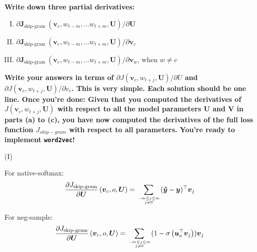 \documentclass[a4 paper]{article}
\newcommand{\bb}[1]{$\boldsymbol{#1}$}
\newcommand{\wtv}{\texttt{word2vec}}
\begin{document}
\textbf{Write down three partial derivatives:}

\begin{enumerate}[(I)]
\item $\partial \boldsymbol{J}_{\text {skip-gram }}\left(\boldsymbol{v}_{c}, w_{t-m}, \ldots w_{t+m}, \boldsymbol{U}\right) / \partial \boldsymbol{U}$
\item $\partial \boldsymbol{J}_{\text {skip-gram }}\left(\boldsymbol{v}_{c}, w_{t-m}, \ldots w_{t+m}, \boldsymbol{U}\right) / \partial \boldsymbol{v}_{c}$
\item $\partial \boldsymbol{J}_{\text {skip-gram }}\left(\boldsymbol{v}_{c}, w_{t-m}, \ldots w_{t+m}, \boldsymbol{U}\right) / \partial \boldsymbol{v}_{w}$, when $w \neq c$
\end{enumerate}

\textbf{Write your answers in terms of $\partial J\left(\boldsymbol{v}_{c}, w_{t+j}, \boldsymbol{U}\right)/\partial U$ and $\partial J\left(\boldsymbol{v}_{c}, w_{t+j}, \boldsymbol{U}\right)/\partial v_c$.
This is very simple.
Each solution should be one line.
Once you’re done: Given that you computed the derivatives of $J\left(\boldsymbol{v}_{c}, w_{t+j}, \boldsymbol{U}\right)$ with respect to all the model parameters \bb{U} and \bb{V} in parts (a) to (c), you have now computed the derivatives of the full loss function $J_{skip-gram}$ with respect to all parameters.
You’re ready to implement \wtv!}

(I) 

For native-softmax:
\begin{equation}
    \begin{aligned}
        \frac{\partial J_{\text {skip-gram}} }{\partial \boldsymbol{U}}
        \left(\boldsymbol{v}_{c}, o, \boldsymbol{U}\right)
        = \sum_{-m \leq j \leq m \atop j \neq 0} (\boldsymbol{\hat{y}} - \boldsymbol{y})^\top\boldsymbol{v}_{j}
    \end{aligned}
\end{equation}

For neg-sample:
\begin{equation}
    \begin{aligned}
        \frac{\partial J_{\text {skip-gram}} }{\partial \boldsymbol{U}}
        \left(\boldsymbol{v}_{c}, o, \boldsymbol{U}\right)
        = \sum_{-m \leq j \leq m \atop j \neq 0} (1-\sigma\left(\boldsymbol{u}_{o}^{\top} \boldsymbol{v}_{j}\right))\boldsymbol{v}_{j}
    \end{aligned}
\end{equation}
\end{document}
